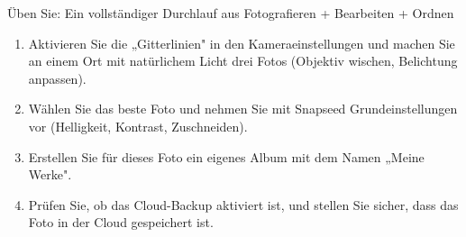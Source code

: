 \begin{tcbpractice}{Üben Sie: Ein vollständiger Durchlauf aus Fotografieren + Bearbeiten + Ordnen}
\begin{enumerate}
  \item Aktivieren Sie die „Gitterlinien" in den Kameraeinstellungen und machen Sie an einem Ort mit natürlichem Licht drei Fotos (Objektiv wischen, Belichtung anpassen).
  \item Wählen Sie das beste Foto und nehmen Sie mit Snapseed Grundeinstellungen vor (Helligkeit, Kontrast, Zuschneiden).
  \item Erstellen Sie für dieses Foto ein eigenes Album mit dem Namen „Meine Werke".
  \item Prüfen Sie, ob das Cloud-Backup aktiviert ist, und stellen Sie sicher, dass das Foto in der Cloud gespeichert ist.
\end{enumerate}

\end{tcbpractice}
